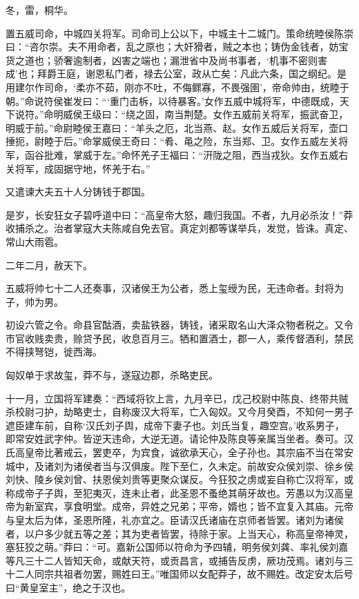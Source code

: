 \documentclass[12pt,UTF8]{ctexbook}
\begin{document}
冬，雷，桐华。



置五威司命，中城四关将军。司命司上公以下，中城主十二城门。策命统睦侯陈崇曰：“咨尔崇。夫不用命者，乱之原也；大奸猾者，贼之本也；铸伪金钱者，妨宝货之道也；骄奢逾制者，凶害之端也；漏泄省中及尚书事者，‘机事不密则害成’也；拜爵王庭，谢恩私门者，禄去公室，政从亡矣：凡此六条，国之纲纪。是用建尔作司命，‘柔亦不茹，刚亦不吐，不侮鳏寡，不畏强圉’，帝命帅由，统睦于朝。”命说符侯崔发曰：“‘重门击柝，以待暴客。’女作五威中城将军，中德既成，天下说符。”命明威侯王级曰：“绕之固，南当荆楚。女作五威前关将军，振武奋卫，明威于前。”命尉睦侯王嘉曰：“羊头之厄，北当燕、赵。女作五威后关将军，壶口捶扼，尉睦于后。”命掌威侯王奇曰：“肴、黾之险，东当郑、卫。女作五威左关将军，函谷批难，掌威于左。”命怀羌子王福曰：“汧陇之阻，西当戎狄。女作五威右关将军，成固据守地，怀羌于右。”



又遣谏大夫五十人分铸钱于郡国。



是岁，长安狂女子碧呼道中曰：“高皇帝大怒，趣归我国。不者，九月必杀汝！”莽收捕杀之。治者掌寇大夫陈咸自免去官。真定刘都等谋举兵，发觉，皆诛。真定、常山大雨雹。



二年二月，赦天下。



五威将帅七十二人还奏事，汉诸侯王为公者，悉上玺绶为民，无违命者。封将为子，帅为男。



初设六管之令。命县官酤酒，卖盐铁器，铸钱，诸采取名山大泽众物者税之。又令市官收贱卖贵，赊贷予民，收息百月三。牺和置酒士，郡一人，乘传督酒利，禁民不得挟弩铠，徙西海。



匈奴单于求故玺，莽不与，遂寇边郡，杀略吏民。



十一月，立国将军建奏：“西域将钦上言，九月辛已，戊己校尉中陈良、终带共贼杀校尉刁护，劫略吏士，自称废汉大将军，亡入匈奴。又今月癸酉，不知何一男子遮臣建车前，自称‘汉氏刘子舆，成帝下妻子也。刘氏当复，趣空宫。’收系男子，即常安姓武字仲。皆逆天违命，大逆无道。请论仲及陈良等亲属当坐者。奏可。汉氏高皇帝比著戒云，罢吏卒，为宾食，诚欲承天心，全子孙也。其宗庙不当在常安城中，及诸刘为诸侯者当与汉俱废。陛下至仁，久未定。前故安众侯刘崇、徐乡侯刘快、陵乡侯刘曾、扶恩侯刘贵等更聚众谋反。今狂狡之虏或妄自称亡汉将军，或称成帝子子舆，至犯夷灭，连未止者，此圣恩不蚤绝其萌牙故也。芳愚以为汉高皇帝为新室宾，享食明堂。成帝，异姓之兄弟；平帝，婿也；皆不宜复入其庙。元帝与皇太后为体，圣恩所隆，礼亦宜之。臣请汉氏诸庙在京师者皆罢。诸刘为诸侯者，以户多少就五等之差；其为吏者皆罢，待除于家。上当天心，称高皇帝神灵，塞狂狡之萌。”莽曰：“可。嘉新公国师以符命为予四辅，明务侯刘龚、率礼侯刘嘉等凡三十二人皆知天命，或献天符，或贡昌言，或捕告反虏，厥功茂焉。诸刘与三十二人同宗共祖者勿罢，赐姓曰王。”唯国师以女配莽子，故不赐姓。改定安太后号曰“黄皇室主”，绝之于汉也。
\end{document}
